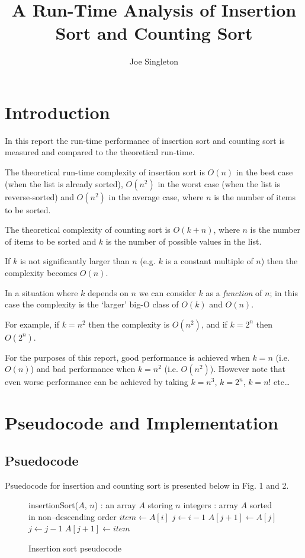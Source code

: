 \documentclass{article}
\title{A Run-Time Analysis of Insertion Sort and Counting Sort}
\author{Joe Singleton}
\date{}
\begin{document}


\maketitle

\section{Introduction}

In this report the run-time performance of insertion sort and counting sort is measured and compared to the theoretical run-time.

The theoretical run-time complexity of insertion sort is $O(n)$ in the best case (when the list is already sorted), $O(n^2)$ in the worst case (when the list is reverse-sorted) and $O(n^2)$ in the average case, where $n$ is the number of items to be sorted.

The theoretical complexity of counting sort is $O(k+n)$, where $n$ is the number of items to be sorted and $k$ is the number of possible values in the list.

If $k$ is not significantly larger than $n$ (e.g. $k$ is a constant multiple of $n$) then the complexity becomes $O(n)$.

In a situation where $k$ depends on $n$ we can consider $k$ as a \textit{function} of $n$; in this case the complexity is the `larger' big-O class of $O(k)$ and $O(n)$.

For example, if $k=n^2$ then the complexity is $O(n^2)$, and if $k=2^n$ then $O(2^n)$.

For the purposes of this report, good performance is achieved when $k=n$ (i.e. $O(n)$) and bad performance when $k=n^2$ (i.e. $O(n^2)$). However note that even worse performance can be achieved by taking $k=n^3$, $k=2^n$, $k=n!$ etc\ldots

\section{Pseudocode and Implementation}

\subsection{Psuedocode}
Psuedocode for insertion and counting sort is presented below in Fig. 1 and 2.

\begin{figure}[H]
\begin{algorithmic}
 insertionSort($A$, $n$)
: an array $A$ storing $n$ integers
: array $A$ sorted in non--descending order
  \STATE $item \leftarrow A[i]$
  \STATE $j \leftarrow i-1$
    \STATE $A[j+1] \leftarrow A[j]$
    \STATE $j \leftarrow j-1$
  \ENDWHILE
  \STATE $A[j+1] \leftarrow item$
\ENDFOR
\end{algorithmic}
\caption{Insertion sort pseudocode}
\end{figure}
\end{document}
